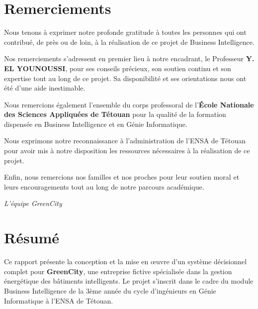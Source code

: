 \documentclass[12pt,a4paper]{report}
\begin{document}

\chapter*{Remerciements}

Nous tenons à exprimer notre profonde gratitude à toutes les personnes qui ont contribué, de près ou de loin, à la réalisation de ce projet de Business Intelligence.

Nos remerciements s'adressent en premier lieu à notre encadrant, le Professeur \textbf{Y. EL YOUNOUSSI}, pour ses conseils précieux, son soutien continu et son expertise tout au long de ce projet. Sa disponibilité et ses orientations nous ont été d'une aide inestimable.

Nous remercions également l'ensemble du corps professoral de l'\textbf{École Nationale des Sciences Appliquées de Tétouan} pour la qualité de la formation dispensée en Business Intelligence et en Génie Informatique.

Nous exprimons notre reconnaissance à l'administration de l'ENSA de Tétouan pour avoir mis à notre disposition les ressources nécessaires à la réalisation de ce projet.

Enfin, nous remercions nos familles et nos proches pour leur soutien moral et leurs encouragements tout au long de notre parcours académique.

\vspace{2cm}

\begin{flushright}
\textit{L'équipe GreenCity}
\end{flushright}

\cleardoublepage


\chapter*{Résumé}

Ce rapport présente la conception et la mise en œuvre d'un système décisionnel complet pour \textbf{GreenCity}, une entreprise fictive spécialisée dans la gestion énergétique des bâtiments intelligents. Le projet s'inscrit dans le cadre du module Business Intelligence de la 3ème année du cycle d'ingénieurs en Génie Informatique à l'ENSA de Tétouan.
\end{document}
